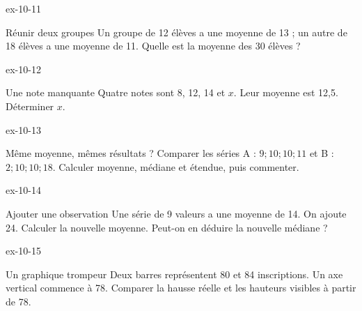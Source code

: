 \clearpage{}
\begin{blocLivre}{ex-10-11}\begin{exercice}[3]{Réunir deux groupes}
Un groupe de 12 élèves a une moyenne de 13 ; un autre de 18 élèves a une moyenne de 11. Quelle est la moyenne des 30 élèves ?
\end{exercice}\end{blocLivre}
\begin{blocLivre}{ex-10-12}\begin{exercice}[3]{Une note manquante}
Quatre notes sont 8, 12, 14 et $x$. Leur moyenne est 12,5. Déterminer $x$.
\end{exercice}\end{blocLivre}
\begin{blocLivre}{ex-10-13}\begin{exercice}[3]{Même moyenne, mêmes résultats ?}
Comparer les séries A : $9;10;10;11$ et B : $2;10;10;18$. Calculer moyenne, médiane et étendue, puis commenter.
\end{exercice}\end{blocLivre}
\begin{blocLivre}{ex-10-14}\begin{exercice}[3]{Ajouter une observation}
Une série de 9 valeurs a une moyenne de 14. On ajoute 24. Calculer la nouvelle moyenne. Peut-on en déduire la nouvelle médiane ?
\end{exercice}\end{blocLivre}
\begin{blocLivre}{ex-10-15}\begin{exercice}[3]{Un graphique trompeur}
Deux barres représentent 80 et 84 inscriptions. Un axe vertical commence à 78. Comparer la hausse réelle et les hauteurs visibles à partir de 78.
\label{fig-ex-10-15}
\end{exercice}\end{blocLivre}

\clearpage

